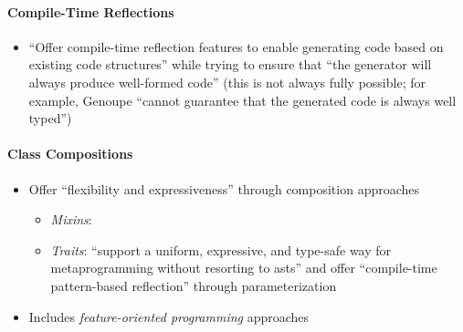 \paragraph{Compile-Time Reflections \cite[p.~113:15-16]{lilis_survey_2019}}
\begin{itemize}
      \item ``Offer compile-time reflection features to enable generating code
            based on existing code structures'' while trying to ensure that ``the
            generator will always produce well-formed code'' (this is not always
            fully possible; for example, Genoupe ``cannot guarantee that the
            generated code is always well typed'')
            \cite[p.~113:15]{lilis_survey_2019}
\end{itemize}

\paragraph{Class Compositions \cite[p.~113:16-17]{lilis_survey_2019}}
\begin{itemize}
      \item Offer ``flexibility and expressiveness'' through composition
            approaches \cite[p.~113:16]{lilis_survey_2019}
            \begin{itemize}
                  \item \emph{Mixins}: 
                  \item \emph{Traits}: ``support a uniform, expressive, and
                        type-safe way for metaprogramming without resorting to
                        \acsp{ast}'' and offer ``compile-time pattern-based
                        reflection'' through parameterization
                        \cite[p.~113:16]{lilis_survey_2019}
            \end{itemize}
      \item Includes \emph{feature-oriented programming} approaches
\end{itemize}

